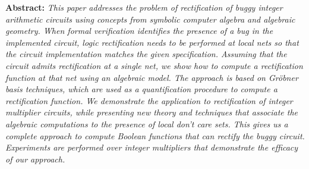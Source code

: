 {\bf Abstract:} {\it This paper addresses the problem of rectification of
buggy integer arithmetic circuits using concepts from symbolic
computer algebra and algebraic geometry. When formal verification
identifies the presence of a bug in the implemented circuit,
logic rectification needs to be performed at local nets so that the
circuit implementation matches the given specification. Assuming that
the circuit admits rectification at a single net, we show how to
compute a rectification function at that net using an algebraic
model. The approach is based on Gr\"obner basis techniques, which are
used as a quantification procedure to compute a rectification
function. We demonstrate the application to rectification of integer
multiplier circuits, while presenting new theory and techniques that
associate the algebraic computations to the presence of local don't
care sets. This gives us a complete approach to compute Boolean
functions that can rectify the buggy circuit. Experiments are
performed over integer multipliers that demonstrate the efficacy of
our approach.}
